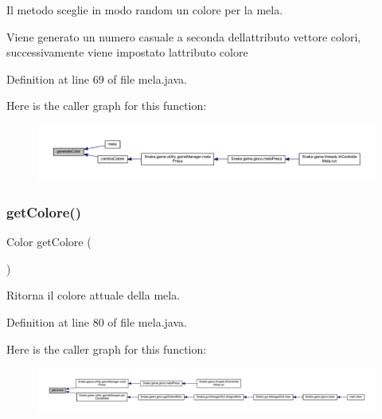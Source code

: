 Il metodo sceglie in modo random un colore per la mela. 

Viene generato un numero casuale a seconda dell\textquotesingle{}attributo vettore colori, successivamente viene impostato l\textquotesingle{}attributo colore 

Definition at line 69 of file mela.\+java.

Here is the caller graph for this function\+:
\nopagebreak
\begin{figure}[H]
\begin{center}
\leavevmode
\includegraphics[width=350pt]{class_snake_1_1game_1_1vipera_1_1mela_a4f720f425b921900de19e238bcd0457a_icgraph}
\end{center}
\end{figure}
\mbox{\label{class_snake_1_1game_1_1vipera_1_1mela_ae3f520a7be49ba6d662a1504fbe4acf3}} 
\subsubsection{\texorpdfstring{get\+Colore()}{getColore()}}
{\footnotesize\ttfamily Color get\+Colore (\begin{DoxyParamCaption}{ }\end{DoxyParamCaption})}



Ritorna il colore attuale della mela. 



Definition at line 80 of file mela.\+java.

Here is the caller graph for this function\+:
\nopagebreak
\begin{figure}[H]
\begin{center}
\leavevmode
\includegraphics[width=350pt]{class_snake_1_1game_1_1vipera_1_1mela_ae3f520a7be49ba6d662a1504fbe4acf3_icgraph}
\end{center}
\end{figure}
\mbox{\label{class_snake_1_1game_1_1vipera_1_1mela_a59a95eee3790a91a574ac018208b6044}} 
